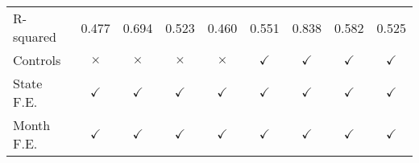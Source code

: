 \begin{tabular}{lcccccccc}
R-squared           &       0.477         &       0.694         &       0.523         &       0.460         &       0.551         &       0.838         &       0.582         &       0.525         \\
Controls            &    $\times$         &    $\times$         &    $\times$         &    $\times$         &$\checkmark$         &$\checkmark$         &$\checkmark$         &$\checkmark$         \\
State F.E.          &$\checkmark$         &$\checkmark$         &$\checkmark$         &$\checkmark$         &$\checkmark$         &$\checkmark$         &$\checkmark$         &$\checkmark$         \\
Month F.E.          &$\checkmark$         &$\checkmark$         &$\checkmark$         &$\checkmark$         &$\checkmark$         &$\checkmark$         &$\checkmark$         &$\checkmark$         \\



\end{tabular}

